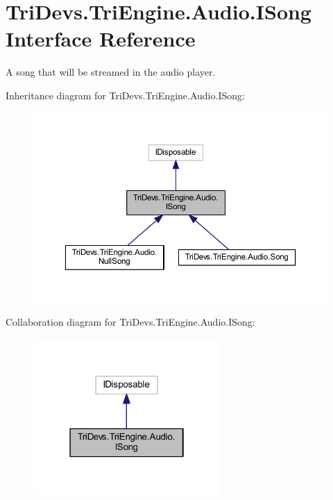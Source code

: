 \hypertarget{interface_tri_devs_1_1_tri_engine_1_1_audio_1_1_i_song}{\section{Tri\-Devs.\-Tri\-Engine.\-Audio.\-I\-Song Interface Reference}
\label{interface_tri_devs_1_1_tri_engine_1_1_audio_1_1_i_song}
}


A song that will be streamed in the audio player.  




Inheritance diagram for Tri\-Devs.\-Tri\-Engine.\-Audio.\-I\-Song\-:
\nopagebreak
\begin{figure}[H]
\begin{center}
\leavevmode
\includegraphics[width=350pt]{interface_tri_devs_1_1_tri_engine_1_1_audio_1_1_i_song__inherit__graph}
\end{center}
\end{figure}


Collaboration diagram for Tri\-Devs.\-Tri\-Engine.\-Audio.\-I\-Song\-:
\nopagebreak
\begin{figure}[H]
\begin{center}
\leavevmode
\includegraphics[width=202pt]{interface_tri_devs_1_1_tri_engine_1_1_audio_1_1_i_song__coll__graph}
\end{center}
\end{figure}
